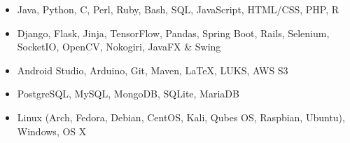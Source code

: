 \documentclass[11pt,letterpaper]{article}
\begin{document}
  \begin{itemize}
    \item{
      {}
      Java, Python, C, Perl, Ruby, Bash, SQL, JavaScript, HTML/CSS, PHP, R
    }

    \item{
      {}
      Django, Flask, Jinja, TensorFlow, Pandas, Spring Boot, Rails, Selenium, SocketIO, OpenCV, Nokogiri, JavaFX \& Swing
    }

    \item{
      {}
      Android Studio, Arduino, Git, Maven, \LaTeX, LUKS, AWS S3
    }

    \item{
      {}
      PostgreSQL, MySQL, MongoDB, SQLite, MariaDB
    }

    \item{
      {}
      Linux (Arch, Fedora, Debian, CentOS, Kali, Qubes OS, Raspbian, Ubuntu), Windows, OS X
    }
  \end{itemize}
\end{document}
